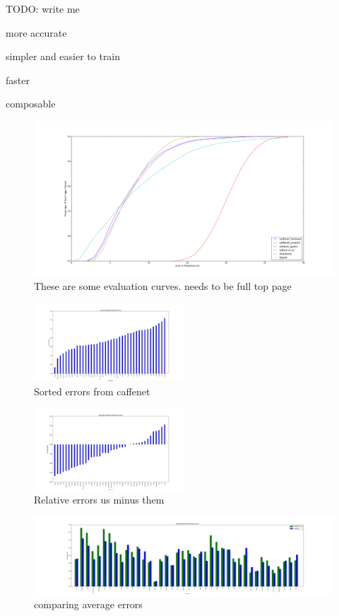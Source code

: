 \documentclass{article}
\begin{document}
TODO: write me

more accurate

simpler and easier to train

faster

composable


\begin{figure}[t]
	\centering
		\includegraphics[width=1.0\textwidth]{figs/fig_1.png}
		\caption{These are some evaluation curves. needs to be full top page}
\end{figure}

\begin{figure}[t]
	\centering
		\includegraphics[width=0.5\textwidth]{figs/caffenet_avg_err.png}
		\caption{Sorted errors from caffenet}
\end{figure}

\begin{figure}[t]
	\centering
		\includegraphics[width=0.5\textwidth]{figs/rel_err.png}
		\caption{Relative errors us minus them}
\end{figure}

\begin{figure}[t]
	\centering
		\includegraphics[width=1.0\textwidth]{figs/avg_err_compare.png}
		\caption{comparing average errors}
\end{figure}

%
%
\end{document}
